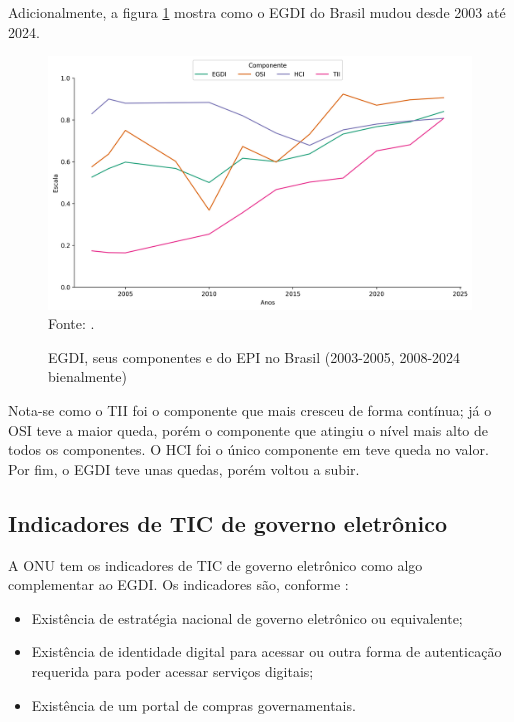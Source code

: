 Adicionalmente, a figura \ref{fig:egdi_brasil_2003_2024} mostra como o EGDI do Brasil mudou desde 2003 até 2024. 

\begin{figure}[H]
	\centering
	\caption{EGDI, seus componentes e do EPI no Brasil (2003-2005, 2008-2024 bienalmente)}
	\includegraphics[width=1\linewidth]{figuras/egdi_brasil_2003_2024.PNG}
	\label{fig:egdi_brasil_2003_2024}
	\footnotesize{Fonte: \cite{ONU_EGDI_dados}.}
\end{figure}

Nota-se como o TII foi o componente que mais cresceu de forma contínua; já o OSI teve a maior queda, porém o componente que atingiu o nível mais alto de todos os componentes. O HCI foi o único componente em teve queda no valor. Por fim, o EGDI teve unas quedas, porém voltou a subir.

\subsection{Indicadores de TIC de governo eletrônico}
\label{indicadores_tic_egov}

A ONU tem os indicadores de TIC de governo eletrônico como algo complementar ao EGDI. Os indicadores são, conforme \cite{ONU_ICT_in_government_indicators}:

\begin{itemize}
	\item Existência de estratégia nacional de governo eletrônico ou equivalente;
	\item Existência de identidade digital para acessar ou outra forma de autenticação requerida para poder acessar serviços digitais;
	\item Existência de um portal de compras governamentais.
\end{itemize}

